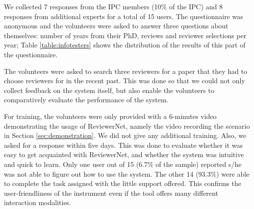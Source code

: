 We collected 7 responses from the IPC members (10\% of the IPC) and 8 responses from additional experts for a total of 15 users. The questionnaire was anonymous and the volunteers were asked to answer three questions about themselves: number of years from their PhD, reviews and reviewer selections per year; Table \ref{table:infotesters} shows the distribution of the results of this part of the questionnaire. 

The volunteers were asked to search three reviewers for a paper that they had to choose reviewers for in the recent past. This was done so that we could not only collect feedback on the system itself, but also enable the volunteers to comparatively evaluate the performance of the system.

For training, the volunteers were only provided with a 6-minutes video demonstrating the usage of ReviewerNet, namely the video recording the scenario in Section \ref{sec:demonstration}. We did not give any additional training. Also, we asked for a response within five days. This was done to evaluate whether it was easy to get acquainted with ReviewerNet, and whether the system was intuitive and quick to learn. Only one user out of 15 (6.7\% of the sample) reported s/he was not able to figure out how to use the system. The other 14 (93.3\%) were able to complete the task assigned with the little support offered. This confirms the user-friendliness of the instrument even if the tool offers many different interaction modalities.

